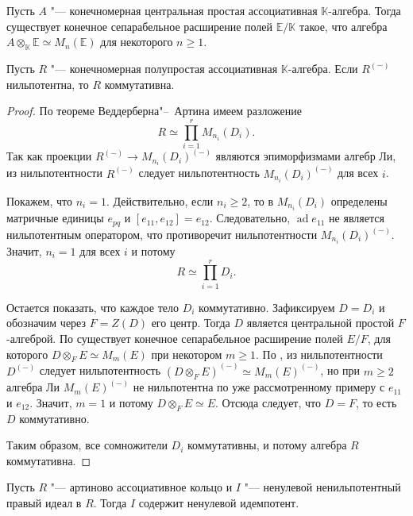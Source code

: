 \documentclass[a4paper,14pt,oneside,openany]{memoir}
\begin{document}
\begin{lemma}\label{l:csa-splitting-field}
    Пусть $A$ "--- конечномерная центральная простая ассоциативная
    $\mathbb{K}$-алгебра. Тогда существует конечное сепарабельное расширение полей
    $\mathbb{E}/\mathbb{K}$ такое, что алгебра $A\otimes_{\mathbb{K}}\mathbb{E}
    \simeq M_n(\mathbb{E})$ для некоторого $n\ge 1$.
\end{lemma}
\begin{lemma}\label{l:lie-nilpotent-semisimple-commutative}
    Пусть $R$ "--- конечномерная полупростая ассоциативная $\mathbb{K}$-алгебра.
    Если $R^{(-)}$ нильпотентна, то $R$ коммутативна.
\end{lemma}
\begin{proof}
    \samepage
    По теореме Веддерберна"--~Артина имеем разложение
    \[
        R \simeq \prod_{i=1}^r M_{n_i}(D_i).
    \]
    Так как проекции $R^{(-)}\to M_{n_i}(D_i)^{(-)}$ являются эпиморфизмами алгебр
    Ли, из нильпотентности $R^{(-)}$ следует нильпотентность $M_{n_i}(D_i)^{(-)}$
    для всех $i$.

    Покажем, что $n_i=1$. Действительно, если $n_i\ge 2$, то в $M_{n_i}(D_i)$
    определены матричные единицы $e_{pq}$ и $[e_{11},e_{12}]=e_{12}$.
    Следовательно, $\operatorname{ad}e_{11}$ не является нильпотентным оператором,
    что противоречит нильпотентности $M_{n_i}(D_i)^{(-)}$. Значит, $n_i=1$ для всех
    $i$ и потому
    \[
        R\simeq \prod_{i=1}^r D_i.
    \]

    Остается показать, что каждое тело $D_i$ коммутативно. Зафиксируем $D = D_i$ и
    обозначим через $F = Z(D)$ его центр. Тогда $D$ является центральной простой
    $F$-алгеброй. По  существует конечное
    сепарабельное расширение полей $E/F$, для которого $ D\otimes_F E\simeq M_m(E)
    $ при некотором $m\ge 1$. По , из
    нильпотентности $D^{(-)}$ следует нильпотентность $(D\otimes_F E)^{(-)}\simeq
    M_m(E)^{(-)}$, но при $m\ge 2$ алгебра Ли $M_m(E)^{(-)}$ не нильпотентна по уже
    рассмотренному примеру с $e_{11}$ и $e_{12}$. Значит, $m=1$ и потому
    $D\otimes_F E\simeq E$. Отсюда следует, что $D=F$, то есть $D$ коммутативно.

    Таким образом, все сомножители $D_i$ коммутативны, и потому алгебра $R$
    коммутативна.
\end{proof}

\begin{lemma}\label{l:idempotent-non-nilpotent-ideal}
    Пусть $R$ "--- артиново ассоциативное кольцо и $I$ "--- ненулевой
    ненильпотентный правый идеал в $R$. Тогда $I$ содержит ненулевой идемпотент.
\end{lemma}
\end{document}
